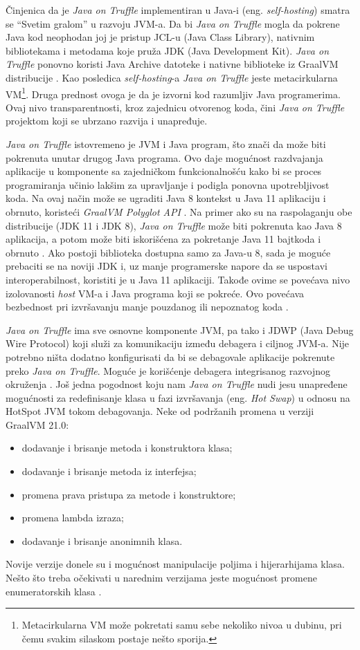 \documentclass[a4paper]{article}
\begin{document}
Činjenica da je \emph{Java on Truffle} implementiran u Java-i (eng. \emph{self-hosting}) smatra se ``Svetim gralom'' u razvoju JVM-a. Da bi \emph{Java on Truffle} mogla da pokrene Java kod neophodan joj je pristup JCL-u (Java Class Library), nativnim bibliotekama i metodama koje pruža JDK (Java Development Kit). \emph{Java on Truffle} ponovno koristi Java Archive datoteke i nativne biblioteke iz GraalVM distribucije \cite{grooteman2017java}. Kao posledica \emph{self-hosting}-a \emph{Java on Truffle} jeste metacirkularna VM\footnote{Metacirkularna VM može pokretati samu sebe nekoliko nivoa u dubinu, pri čemu svakim silaskom postaje nešto sporija.}. Druga prednost ovoga je da je izvorni kod razumljiv Java programerima. Ovaj nivo transparentnosti, kroz zajednicu otvorenog koda, čini \emph{Java on Truffle} projektom koji se ubrzano razvija i unapređuje.

\emph{Java on Truffle} istovremeno je JVM i Java program, što znači da može biti pokrenuta unutar drugog Java programa. Ovo daje mogućnost razdvajanja aplikacije u komponente sa zajedničkom funkcionalnošću kako bi se proces programiranja učinio lakšim za upravljanje i podigla ponovna upotrebljivost koda. Na ovaj način može se ugraditi Java 8 kontekst u Java 11 aplikaciju i obrnuto, koristeći \emph{GraalVM Polyglot API} \cite{graalvm}. Na primer ako su na raspolaganju obe distribucije (JDK 11 i JDK 8),
\emph{Java on Truffle} može biti pokrenuta kao Java 8 aplikacija, a potom može biti iskorišćena za pokretanje Java 11 bajtkoda i obrnuto \cite{grooteman2017java}. Ako postoji biblioteka dostupna samo za Java-u 8, sada je moguće prebaciti se na noviji JDK i, uz manje programerske napore da se uspostavi interoperabilnost, koristiti je u Java 11 aplikaciji. Takođe ovime se povećava nivo izolovanosti \emph{host} VM-a i Java programa koji se pokreće. Ovo povećava bezbednost pri izvršavanju manje pouzdanog ili nepoznatog koda \cite{graalvm}.

\emph{Java on Truffle} ima sve osnovne komponente JVM, pa tako i JDWP (Java Debug Wire Protocol) koji služi za komunikaciju između debagera i ciljnog JVM-a. Nije potrebno ništa dodatno konfigurisati da bi se debagovale aplikacije pokrenute preko \emph{Java on Truffle}. Moguće je korišćenje debagera integrisanog razvojnog okruženja \cite{graalvm}. Još jedna pogodnost koju nam \emph{Java on Truffle} nudi jesu unapređene mogućnosti za redefinisanje klasa u fazi izvršavanja (eng. \emph{Hot Swap}) u odnosu na HotSpot JVM tokom debagovanja. Neke od podržanih promena u verziji GraalVM 21.0:
\begin{itemize}
    \item dodavanje i brisanje metoda i konstruktora klasa;
    \item dodavanje i brisanje metoda iz interfejsa;
    \item promena prava pristupa za metode i konstruktore;
    \item promena lambda izraza;
    \item dodavanje i brisanje anonimnih klasa.
\end{itemize}
Novije verzije donele su i mogućnost manipulacije poljima i hijerarhijama klasa. Nešto što treba očekivati u narednim verzijama jeste mogućnost promene enumeratorskih klasa \cite{graalvm}.
\end{document}
